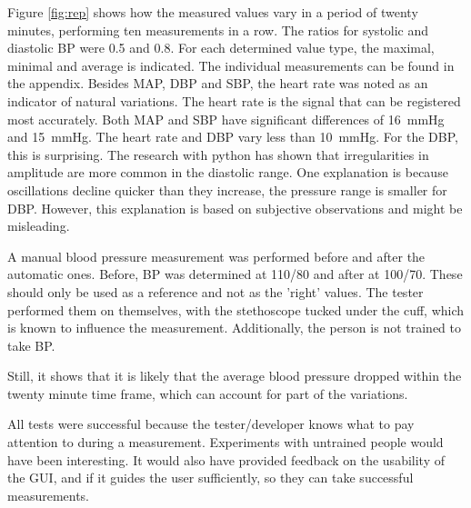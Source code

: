 Figure \ref{fig:rep} shows how the measured values vary in a period of twenty minutes, performing ten measurements in a row. The ratios for systolic and diastolic BP were 0.5 and 0.8. For each determined value type, the maximal, minimal and average is indicated. The individual measurements can be found in the appendix. Besides MAP, DBP and SBP, the heart rate was noted as an indicator of natural variations. The heart rate is the signal that can be registered most accurately. Both MAP and SBP have significant differences of \SI{16}{\mmHg} and \SI{15}{mmHg}. The heart rate and DBP vary less than \SI{10}{\mmHg}. For the DBP, this is surprising. The research with python has shown that irregularities in amplitude are more common in the diastolic range. One explanation is because oscillations decline quicker than they increase, the pressure range is smaller for DBP. However, this explanation is based on subjective observations and might be misleading. 

A manual blood pressure measurement was performed before and after the automatic ones. Before, BP was determined at 110/80 and after at 100/70. These should only be used as a reference and not as the 'right' values. The tester performed them on themselves, with the stethoscope tucked under the cuff, which is known to influence the measurement. Additionally, the person is not trained to take BP. 

Still, it shows that it is likely that the average blood pressure dropped within the twenty minute time frame, which can account for part of the variations.

All tests were successful because the tester/developer knows what to pay attention to during a measurement. Experiments with untrained people would have been interesting. It would also have provided feedback on the usability of the GUI, and if it guides the user sufficiently, so they can take successful measurements. 